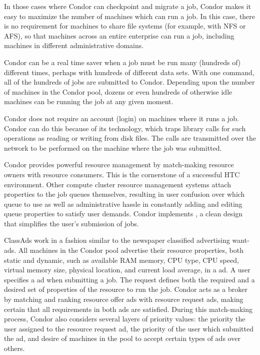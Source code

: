In those cases where Condor can checkpoint and migrate a job,
Condor makes it easy to maximize the number of machines which can run
a job.
In this case, there is no requirement for machines to
share file systems (for example, with NFS or AFS),
so that machines across an entire enterprise can run a job,
including machines in different administrative domains.

Condor can be a real time saver when a job
must be run many (hundreds of) different times,
perhaps with hundreds of different data sets.
With one command, all of the hundreds of jobs are submitted to Condor.
Depending upon the number of machines in the Condor pool,
dozens or even hundreds of otherwise idle machines
can be running the job at any given moment.

Condor does not require an account (login) on machines where it runs a job.
Condor can do this because of its 
technology,
which traps
library calls for such operations as reading or writing from disk
files.
The calls are transmitted over the network to be performed on the machine
where the job was submitted.

Condor provides powerful resource management by
match-making resource
owners with resource consumers.
This is the cornerstone of a successful HTC environment.
Other compute cluster resource management
systems attach properties to the job queues themselves,
resulting in user confusion over which queue to use as well as administrative
hassle in constantly adding and editing queue properties to satisfy user
demands.
Condor implements 
,
a clean design that simplifies the user's submission of jobs.

ClassAds work in a fashion similar to the newspaper classified
advertising want-ads. All machines in the Condor pool advertise their
resource properties, both static and dynamic,
such as available RAM memory, CPU type, CPU speed,
virtual memory size, physical location, and current load average,
in a  ad.
A user specifies a  ad
when submitting a job.
The request defines both the required and a desired set of properties
of the resource to run the job.
Condor acts as a broker by matching and ranking resource
offer ads with resource request ads, making certain that all
requirements in both ads are satisfied.
During this match-making process,
Condor also considers several layers of priority values:
the priority the user assigned to the resource request ad,
the priority of the user which submitted the ad,
and desire of
machines in the pool to accept certain types of ads over others. 

